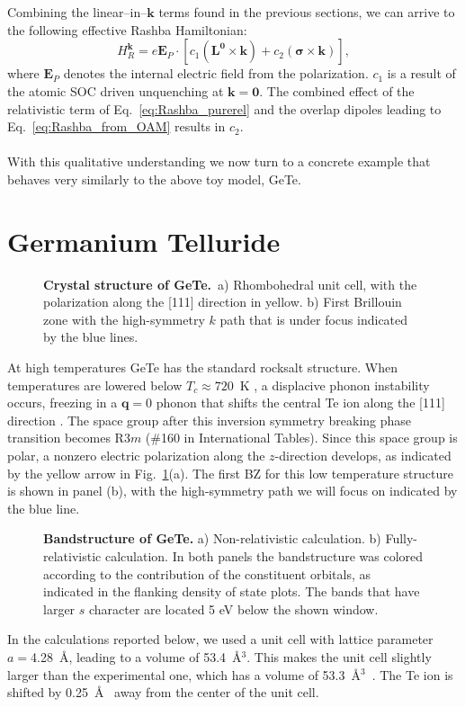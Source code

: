 \\\\
Combining the linear--in--$\bm k$ terms found in the previous sections, we can arrive to the following effective Rashba Hamiltonian:
\begin{equation}
	\label{eq:Rashba_hami}
	H_R^{\bm k} = e \bm{E}_P\cdot \left[c_1(\bm{L}^{\bm 0} \times \bm k) + c_2 (\bm \sigma \times \bm k) \right],
\end{equation}
where $\bm{E}_P$ denotes the internal electric field from the polarization.
$c_1$ is a result of the atomic SOC driven unquenching at $\bm k = \bm 0$.
The combined effect of the relativistic term of Eq.~\eqref{eq:Rashba_purerel} and the overlap dipoles leading to Eq.~\eqref{eq:Rashba_from_OAM} results in $c_2$.
\\\\
With this qualitative understanding we now turn to a concrete example that behaves very similarly to the above toy model, GeTe.

\section{Germanium Telluride}
\begin{figure}[h]
\caption{\label{fig:Rashba_crystal}{\bf Crystal structure of GeTe.}~a) Rhombohedral unit cell, with the polarization along the [111] direction in yellow. b) First Brillouin zone with the high-symmetry $k$ path that is under focus indicated by the blue lines.}
\end{figure}
At high temperatures GeTe has the standard rocksalt structure.
When temperatures are lowered below $T_c \approx 720$~K \cite{DiSante2013}, a displacive phonon instability occurs, freezing in a $\bm{q} = 0$ phonon that shifts the central Te ion along the [111] direction \cite{Rabe1987}.
The space group after this inversion symmetry breaking phase transition becomes R$3m$ (\#160 in International Tables).
Since this space group is polar, a nonzero electric polarization along the $z$-direction develops, as indicated by the yellow arrow in Fig.~\ref{fig:Rashba_crystal}(a).
The first BZ for this low temperature structure is shown in panel (b), with the high-symmetry path we will focus on indicated by the blue line.

\begin{figure}[h!]
\caption{\label{fig:Rashba_bands_dos}{\bf Bandstructure of GeTe.} a) Non-relativistic calculation. b) Fully-relativistic calculation. In both panels the bandstructure was colored according to the contribution of the constituent orbitals, as indicated in the flanking density of state plots. The bands that have larger $s$ character are located 5 eV below the shown window.}
\end{figure}
In the calculations reported below, we used a unit cell with lattice parameter $a=$4.28~\AA, leading to a volume of 53.4~\AA$^3$.
This makes the unit cell slightly larger than the experimental one, which has a volume of 53.3~\AA$^3$~\cite{Serebryanaya1995}.
The Te ion is shifted by 0.25~\AA~ away from the center of the unit cell.

